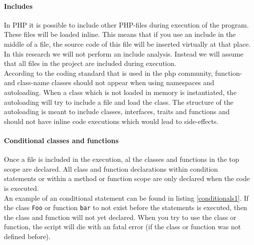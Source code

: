 \documentclass[../main.tex]{subfiles}
\begin{document}
    \paragraph{Includes}
    In PHP it is possible to include other PHP-files during execution of the program. 
    These files will be loaded inline. 
    This means that if you use an include in the middle of a file, the source code of this file will be inserted virtually at that place.
    In this research we will not perform an include analysis.
    Instead we will assume that all files in the project are included during execution. 
    \\
    According to the coding standard that is used in the php community\footnotemark, function- and class-name classes should not appear when using namespaces and autoloading.
    When a class which is not loaded in memory is instantiated, the autoloading will try to include a file and load the class.
    The structure of the autoloading is meant to include classes, interfaces, traits and functions and should not have inline code executions which would lead to side-effects.
    
    \paragraph{Conditional classes and functions}
    Once a file is included in the execution, al the classes and functions in the top scope are declared.
    All class and function declarations within condition statements or within a method or function scope are only declared when the code is executed.
    \\
    An example of an conditional statement can be found in listing \ref{conditionals1}.
    If the class \texttt{Foo} or function \texttt{bar} to not exist before the statements is executed, then the class and function will not yet declared. 
    When you try to use the class or function, the script will die with an fatal error (if the class or function was not defined before).

    
\end{document}
